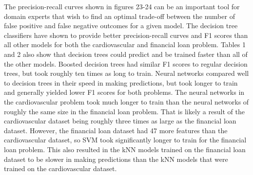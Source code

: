 \documentclass[10pt,journal,compsoc]{IEEEtran}
\begin{document}
The precision-recall curves shown in figures 23-24 can be an important tool for domain experts that wish to find an optimal trade-off between the number of false positive and false negative outcomes for a given model. The decision tree classifiers have shown to provide better precision-recall curves and F1 scores than all other models for both the cardiovascular and financial loan problem. Tables 1 and 2 also show that decision trees could predict and be trained faster than all of the other models. Boosted decision trees had similar F1 scores to regular decision trees, but took roughly ten times as long to train. Neural networks compared well to decision trees in their speed in making predictions, but took longer to train and generally yielded lower F1 scores for both problems. The neural networks in the cardiovascular problem took much longer to train than the neural networks of roughly the same size in the financial loan problem. That is likely a result of the cardiovascular dataset being roughly three times as large as the financial loan dataset. However, the financial loan dataset had 47 more features than the cardiovascular dataset, so SVM took significantly longer to train for the financial loan problem. This also resulted in the kNN models trained on the financial loan dataset to be slower in making predictions than the kNN models that were trained on the cardiovascular dataset.








\end{document}
